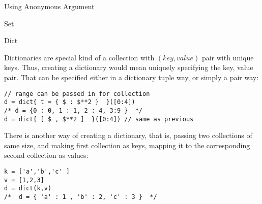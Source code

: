 \begin{section}{Using Anonymous Argument}
\begin{subsection}{Set}
\end{subsection}

\begin{subsection}{Dict}

Dictionaries are special kind of a collection with $(key,value)$ pair with unique keys.
Thus, creating a dictionary would mean uniquely specifying the key, value pair.
That can be specified either in a dictionary tuple way, or simply a pair way: 

\begin{lstlisting}[style=JexlStyle]
// range can be passed in for collection
d = dict{ t = { $ : $**2 }  }([0:4])
/* d = {0 : 0, 1 : 1, 2 : 4, 3:9 }  */
d = dict{ [ $ , $**2 ]  }([0:4]) // same as previous
\end{lstlisting}

There is another way of creating a dictionary, that is, 
passing two collections of same size, and making first collection 
as keys, mapping it to the corresponding second collection as values:

\begin{lstlisting}[style=JexlStyle]
k = ['a','b','c' ]
v = [1,2,3]
d = dict(k,v)
/*  d = { 'a' : 1 , 'b' : 2, 'c' : 3 }  */ 
\end{lstlisting}

\end{subsection}

\end{section}


